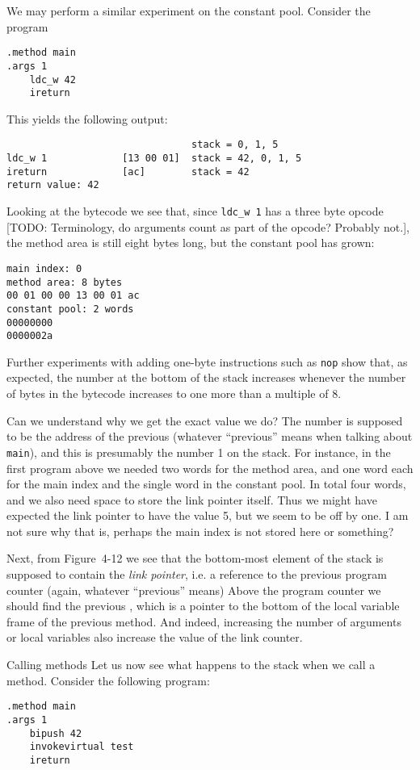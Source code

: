 \documentclass[article, a4paper, 11pt, oneside]{memoir}
\numberwithin{equation}{chapter}
\newcommand{\inlinecode}[1]{\colorbox{lightgray}{\vphantom{\texttt{jk}}\lstinline$#1$}}
\renewcommand{\inlinecode}{\lstinline}
\begin{document}
\begin{notelist}
We may perform a similar experiment on the constant pool. Consider the program
%
\begin{lstlisting}
.method main
.args 1
    ldc_w 42
    ireturn
\end{lstlisting}
%
This yields the following output:
%
\begin{lstlisting}
                                stack = 0, 1, 5
ldc_w 1             [13 00 01]  stack = 42, 0, 1, 5
ireturn             [ac]        stack = 42
return value: 42
\end{lstlisting}
%
Looking at the bytecode we see that, since \inlinecode{ldc_w 1} has a three byte opcode [TODO: Terminology, do arguments count as part of the opcode? Probably not.], the method area is still eight bytes long, but the constant pool has grown:
%
\begin{lstlisting}
main index: 0
method area: 8 bytes
00 01 00 00 13 00 01 ac 
constant pool: 2 words
00000000
0000002a    
\end{lstlisting}
%
Further experiments with adding one-byte instructions such as \inlinecode{nop} show that, as expected, the number at the bottom of the stack increases whenever the number of bytes in the bytecode increases to one more than a multiple of 8.

Can we understand why we get the exact value we do? The number is supposed to be the address of the previous  (whatever \enquote{previous} means when talking about \inlinecode{main}), and this is presumably the number 1 on the stack. For instance, in the first program above we needed two words for the method area, and one word each for the main index and the single word in the constant pool. In total four words, and we also need space to store the link pointer itself. Thus we might have expected the link pointer to have the value 5, but we seem to be off by one. I am not sure why that is, perhaps the main index is not stored here or something?

Next, from Figure~4-12 we see that the bottom-most element of the stack is supposed to contain the \emph{link pointer}, i.e. a reference to the previous program counter (again, whatever \enquote{previous} means) Above the program counter we should find the previous , which is a pointer to the bottom of the local variable frame of the previous method. And indeed, increasing the number of arguments or local variables also increase the value of the link counter.

\item[Calling methods]
Let us now see what happens to the stack when we call a method. Consider the following program:
%
\begin{lstlisting}
.method main
.args 1
    bipush 42
    invokevirtual test
    ireturn


\end{lstlisting}
\end{notelist}
\end{document}
